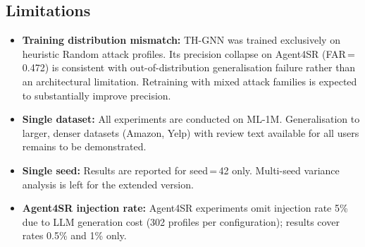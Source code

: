 \subsection{Limitations}
\label{sec:limitations}

\begin{itemize}
  \item \textbf{Training distribution mismatch:} TH-GNN was trained exclusively on heuristic Random attack profiles. Its precision collapse on Agent4SR (FAR\,=\,0.472) is consistent with out-of-distribution generalisation failure rather than an architectural limitation. Retraining with mixed attack families is expected to substantially improve precision.
  \item \textbf{Single dataset:} All experiments are conducted on ML-1M. Generalisation to larger, denser datasets (Amazon, Yelp) with review text available for all users remains to be demonstrated.
  \item \textbf{Single seed:} Results are reported for seed\,=\,42 only. Multi-seed variance analysis is left for the extended version.
  \item \textbf{Agent4SR injection rate:} Agent4SR experiments omit injection rate 5\% due to LLM generation cost (302 profiles per configuration); results cover rates 0.5\% and 1\% only.
\end{itemize}
